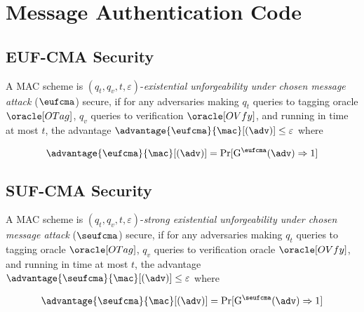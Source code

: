 \newpage
\section{Message Authentication Code}

\subsection{EUF-CMA Security}
A MAC scheme is $(q_t, q_v, t, \varepsilon)$-\textit{existential unforgeability under chosen message attack} ($\eufcma$) secure, if for any adversaries making $q_t$ queries to tagging oracle $\oracle[OTag]$, $q_v$ queries to verification $\oracle[OVfy]$, and running in time at most $t$, the advantage $\advantage{\eufcma}{\mac}[(\adv)] \leq \varepsilon$ where 

$$
\advantage{\eufcma}{\mac}[(\adv)] = \Pr[\mathrm{G}^\eufcma(\adv) \Rightarrow 1] 
$$

\subsection{SUF-CMA Security}
A MAC scheme is $(q_t, q_v, t, \varepsilon)$-\textit{strong existential unforgeability under chosen message attack} ($\seufcma$) secure, if for any adversaries making $q_t$ queries to tagging oracle $\oracle[OTag]$, $q_v$ queries to verification oracle $\oracle[OVfy]$, and running in time at most $t$, the advantage $\advantage{\seufcma}{\mac}[(\adv)] \leq \varepsilon$ where

$$
\advantage{\seufcma}{\mac}[(\adv)] = \Pr[\mathrm{G}^\seufcma(\adv) \Rightarrow 1] 
$$

